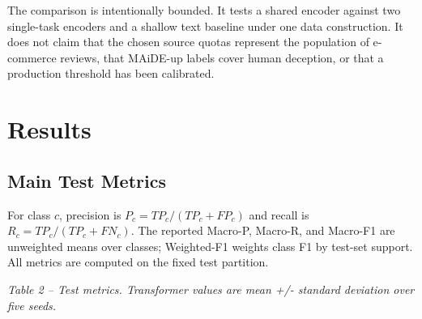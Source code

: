 \documentclass[11pt,a4paper]{article}
\begin{document}
The comparison is intentionally bounded. It tests a shared encoder
against two single-task encoders and a shallow text baseline under one
data construction. It does not claim that the chosen source quotas
represent the population of e-commerce reviews, that MAiDE-up labels
cover human deception, or that a production threshold has been
calibrated.

\section{Results}

\subsection{Main Test Metrics}

For class $c$, precision is $P_c=TP_c/(TP_c+FP_c)$ and recall is $R_c=TP_c/(TP_c+FN_c)$. The reported Macro-P, Macro-R, and Macro-F1 are unweighted means over classes; Weighted-F1 weights class F1 by test-set support. All metrics are computed on the fixed test partition.

\emph{Table 2 -- Test metrics. Transformer values are mean +/- standard
deviation over five seeds.}
\end{document}
